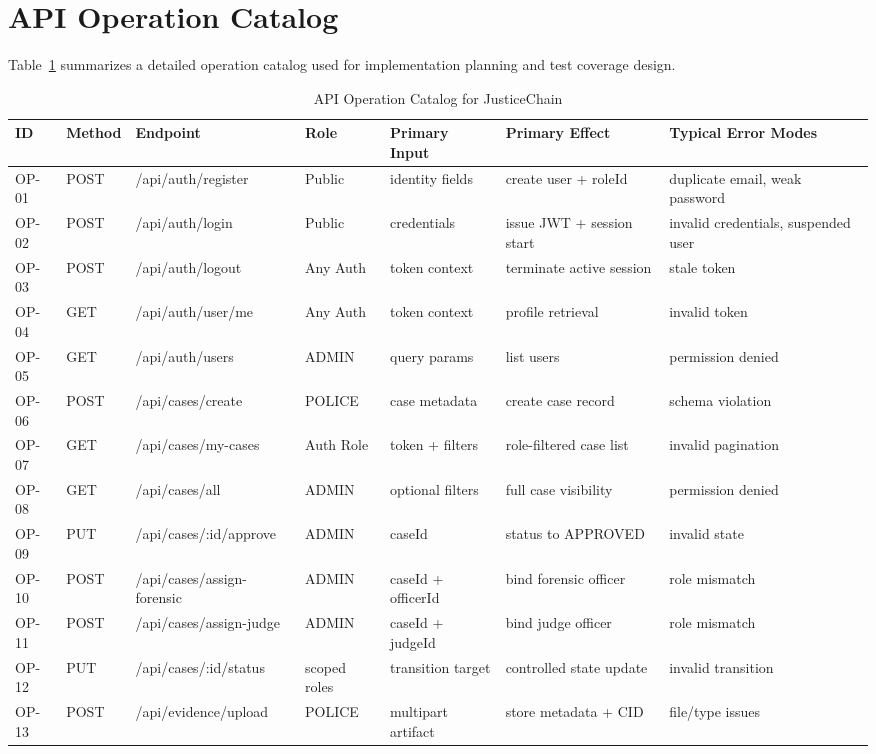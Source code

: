 \documentclass[conference]{IEEEtran}
\begin{document}
\section{API Operation Catalog}
Table~\ref{tab:apicatalog} summarizes a detailed operation catalog used for implementation planning and test coverage design.

\begin{table}[!t]
\caption{API Operation Catalog for JusticeChain}
\label{tab:apicatalog}
\centering
\begin{tabular}{p{0.75cm} p{1.8cm} p{2.15cm} p{1.25cm} p{2.1cm} p{2.8cm} p{2.4cm}}
\hline
\textbf{ID} & \textbf{Method} & \textbf{Endpoint} & \textbf{Role} & \textbf{Primary Input} & \textbf{Primary Effect} & \textbf{Typical Error Modes} \\
\hline
OP-01 & POST & /api/auth/register & Public & identity fields & create user + roleId & duplicate email, weak password \\
OP-02 & POST & /api/auth/login & Public & credentials & issue JWT + session start & invalid credentials, suspended user \\
OP-03 & POST & /api/auth/logout & Any Auth & token context & terminate active session & stale token \\
OP-04 & GET & /api/auth/user/me & Any Auth & token context & profile retrieval & invalid token \\
OP-05 & GET & /api/auth/users & ADMIN & query params & list users & permission denied \\
OP-06 & POST & /api/cases/create & POLICE & case metadata & create case record & schema violation \\
OP-07 & GET & /api/cases/my-cases & Auth Role & token + filters & role-filtered case list & invalid pagination \\
OP-08 & GET & /api/cases/all & ADMIN & optional filters & full case visibility & permission denied \\
OP-09 & PUT & /api/cases/:id/approve & ADMIN & caseId & status to APPROVED & invalid state \\
OP-10 & POST & /api/cases/assign-forensic & ADMIN & caseId + officerId & bind forensic officer & role mismatch \\
OP-11 & POST & /api/cases/assign-judge & ADMIN & caseId + judgeId & bind judge officer & role mismatch \\
OP-12 & PUT & /api/cases/:id/status & scoped roles & transition target & controlled state update & invalid transition \\
OP-13 & POST & /api/evidence/upload & POLICE & multipart artifact & store metadata + CID & file/type issues \\

\end{tabular}
\end{table}
\end{document}
